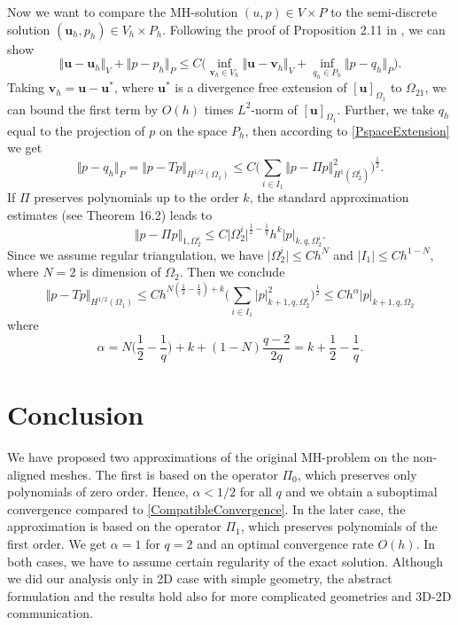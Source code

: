 \documentclass{elsarticle}
\def\vc#1{\mathbf{\boldsymbol{#1}}}     %
\def\abs#1{\lvert#1\rvert}
\def\norm#1{\bigl\Vert#1\bigr\Vert} %
\def\vl{{\vc{u}}}
\begin{document}
Now we want to compare the MH-solution $(u,p)\in V\times P$ to the semi-discrete solution $(\vl_h,p_h)\in V_h\times P_h$. Following the proof of Proposition 2.11 in \cite{Brezzi}, we can show
\begin{equation}\label{MainEst}
        \norm{\vl-\vl_h}_V + \norm{p-p_h}_P \le C\big(
                \inf_{\vc v_h \in V_h}\norm{\vl - \vc v_h}_{V} + \inf_{q_h\in P_h}\norm{p-q_h}_{P}
                \big).
\end{equation}
Taking $\vc v_h=\vl-\vl^*$, where $\vl^*$ is a divergence free extension of $[\vl]_{\Omega_1}$
to $\Omega_{21}$, we can bound the first term by $O(h)$ times $L^2$-norm of $[\vl]_{\Omega_1}$.
Further, we take $q_h$ equal to the projection of $p$ on the space $P_h$, then according to \eqref{PspaceExtension} we get
\[
  \norm{p-q_h}_{P} = \norm{p-T p}_{H^{1/2}(\Omega_1)}\le C\Big(\sum_{i\in I_1} \norm{p - \Pi p}_{H^1(\Omega_2^i)}^2\Big) ^\frac12.
\]
If $\Pi$ preserves polynomials up to the order $k$, the standard approximation estimates
(see \cite{FEMHandbook} Theorem 16.2) leads to
\[
 \norm{p-\Pi p}_{1,\Omega_2^i}\le C\abs{\Omega_2^i}^{\frac12-\frac1q} h^k \abs{p}_{k,q,\Omega_2^i}.
\]
Since we assume regular triangulation, we have $\abs{\Omega_2^i}\le C h^N$ and $\abs{I_1} \le C h^{1-N}$,
where $N=2$ is dimension of $\Omega_2$.
Then we conclude
\[
        \norm{p-Tp}_{H^{1/2}(\Omega_1)}\le C h^{N(\frac12-\frac1q)+k}\Big(\sum_{i\in I_1} \abs{p}_{k+1,q,\Omega_2^i}^2 \Big)^\frac12\le
        C h^\alpha \abs{p}_{k+1,q,\Omega_2}
\]
where 
\begin{equation}\label{ApproxOrder}
        \alpha= N\Big(\frac12-\frac1q\Big)+k+(1-N)\frac{q-2}{2q}=k+\frac{1}{2}-\frac{1}{q}.
\end{equation}

\section{Conclusion}
We have proposed two approximations of the original MH-problem on the non-aligned meshes. 
The first is based
on the operator $\Pi_0$, which preserves only polynomials of zero order. Hence, $\alpha<1/2$ for all $q$ and we obtain a suboptimal convergence compared to \eqref{CompatibleConvergence}. In the later case, the approximation is based on the operator
$\Pi_1$, which preserves polynomials of the first order. We get $\alpha=1$ for $q=2$ and an optimal  convergence rate $O(h)$.
In both cases, we have to assume certain regularity of the exact solution. Although we did our analysis
only in 2D case with simple geometry, the abstract formulation and the results hold also for more complicated geometries and 3D-2D communication. 
\end{document}

